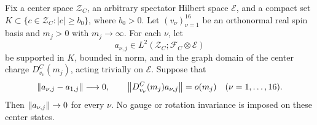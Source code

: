 \begin{lemma}
\label{count:center-confinement}
Fix a center space \(\mathcal Z_C\), an arbitrary spectator Hilbert space
\(\mathcal E\), and a compact set
\(K\subset\{c\in\mathcal Z_C:|c|\ge b_0\}\), where \(b_0>0\).
Let \((v_\nu)_{\nu=1}^{16}\) be an orthonormal real spin basis and
\(m_j>0\) with \(m_j\to\infty\). For each \(\nu\), let
\[
 a_{\nu,j}\in L^2(\mathcal Z_C;\mathcal F_C\otimes\mathcal E)
\]
be supported in \(K\), bounded in norm, and in the graph domain of the
center charge \(D_{v_\nu}^C(m_j)\), acting trivially on \(\mathcal E\).
Suppose that
\[
 \left\lVert a_{\nu,j}-a_{1,j}\right\rVert\longrightarrow0,
 \qquad
 \left\lVert D_{v_\nu}^C(m_j)a_{\nu,j}\right\rVert=o(m_j)
 \quad(\nu=1,\ldots,16).
\]
Then \(\left\lVert a_{\nu,j}\right\rVert\to0\) for every \(\nu\).
No gauge or rotation invariance is imposed on these center states.
\end{lemma}

